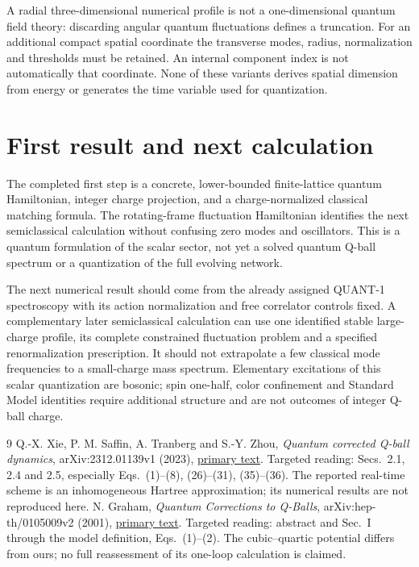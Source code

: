 \documentclass[11pt,a4paper]{article}
\begin{document}
A radial three-dimensional numerical profile is not a one-dimensional quantum
field theory: discarding angular quantum fluctuations defines a truncation.
For an additional compact spatial coordinate the transverse modes, radius,
normalization and thresholds must be retained. An internal component index is
not automatically that coordinate. None of these variants derives spatial
dimension from energy or generates the time variable used for quantization.

\section{First result and next calculation}
The completed first step is a concrete, lower-bounded finite-lattice quantum
Hamiltonian, integer charge projection, and a charge-normalized classical
matching formula. The rotating-frame fluctuation Hamiltonian identifies the
next semiclassical calculation without confusing zero modes and oscillators.
This is a quantum formulation of the scalar sector, not yet a solved quantum
Q-ball spectrum or a quantization of the full evolving network.

The next numerical result should come from the already assigned QUANT-1
spectroscopy with its action normalization and free correlator controls fixed.
A complementary later semiclassical calculation can use one identified stable
large-charge profile, its complete constrained fluctuation problem and a
specified renormalization prescription. It should not extrapolate a few
classical mode frequencies to a small-charge mass spectrum.
Elementary excitations of this scalar quantization are bosonic; spin one-half,
color confinement and Standard Model identities require additional structure
and are not outcomes of integer Q-ball charge.

\begin{thebibliography}{9}
 Q.-X. Xie, P. M. Saffin, A. Tranberg and S.-Y. Zhou,
\emph{Quantum corrected Q-ball dynamics}, arXiv:2312.01139v1 (2023),
\href{https://arxiv.org/html/2312.01139v1}{primary text}.
Targeted reading: Secs.~2.1, 2.4 and 2.5, especially Eqs.~(1)--(8),
(26)--(31), (35)--(36). The reported real-time scheme is an inhomogeneous
Hartree approximation; its numerical results are not reproduced here.
 N. Graham, \emph{Quantum Corrections to Q-Balls},
arXiv:hep-th/0105009v2 (2001),
\href{https://arxiv.org/html/hep-th/0105009v2}{primary text}.
Targeted reading: abstract and Sec.~I through the model definition,
Eqs.~(1)--(2). The cubic--quartic potential differs from ours; no full
reassessment of its one-loop calculation is claimed.
\end{thebibliography}
\end{document}
